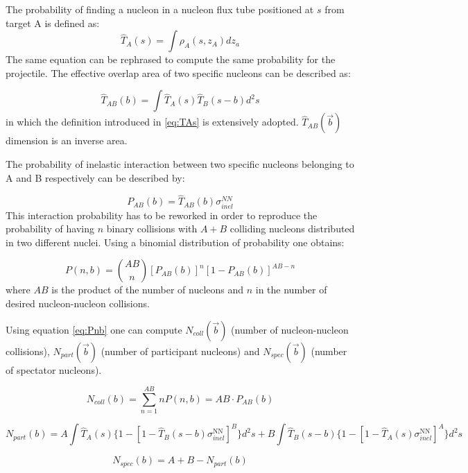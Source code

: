 The probability of finding a nucleon in a nucleon flux tube positioned at $s$ from target A is defined as:
\begin{equation}
\label{eq:TAs}
\hat{T}_A(s) = \int{\rho}_A(s,z_A)dz_a
\end{equation}
The same equation can be rephrased to compute the same probability for the projectile.
The effective overlap area of two specific nucleons can be described as:

\begin{equation}
\label{eq:TAB}
\hat{T}_{AB}(b) = \int\hat{T}_A(s)\hat{T}_B(s-b)d^2s
\end{equation}
in which the definition introduced in \ref{eq:TAs} is extensively adopted.
$\hat{T}_{AB}(\vec{b})$ dimension is an inverse area.

The probability of inelastic interaction between two specific nucleons belonging to A and B respectively can be described by:

\begin{equation}
\label{eq:PAB}
P_{AB}(b)=\hat{T}_{AB}(b)\sigma_{inel}^{NN}
\end{equation}
This interaction probability has to be reworked in order to reproduce the probability of having $n$ binary collisions with $A+B$ colliding nucleons distributed in two different nuclei.
Using a binomial distribution of probability one obtains:

\begin{equation}
\label{eq:Pnb}
P(n,b)=\binom{AB}{n}[P_{AB}(b)]^n[1-P_{AB}(b)]^{AB-n}
\end{equation}
where $AB$ is the product of the number of nucleons and $n$ in the number of desired nucleon-nucleon collisions.

Using equation \ref{eq:Pnb} one can compute $N_{coll}(\vec{b})$ (number of nucleon-nucleon collisions), $N_{part}(\vec{b})$ (number of participant nucleons) and $N_{spec}(\vec{b})$ (number of spectator nucleons).

\begin{equation}
\label{eq:Ncoll}
N_{coll}(b)=\sum_{n=1}^{AB}nP(n,b)=AB\cdot P_{AB}(b)
\end{equation}

\begin{equation}
\label{eq:Npart}
N_{part}(b)=A\int\hat{T}_A(s)\{1-[1-\hat{T}_B(s-b)\sigma_{inel}^{\mathrm{NN}}]^B\}d^2s + B\int\hat{T}_B(s-b)\{1-[1-\hat{T}_A(s)\sigma_{inel}^{\mathrm{NN}}]^A\}d^2s
\end{equation}

\begin{equation}
\label{eq:Nspec}
N_{spec}(b)=A+B-N_{part}(b)
\end{equation}

